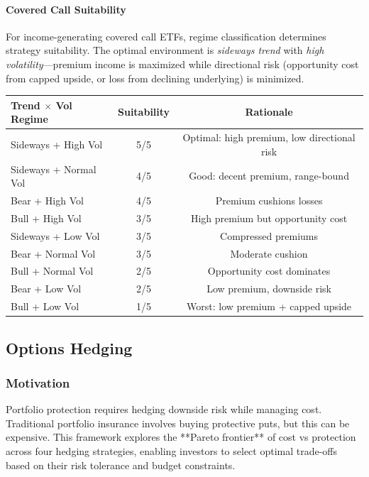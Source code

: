 \paragraph{Covered Call Suitability}

For income-generating covered call ETFs, regime classification determines strategy suitability. The optimal environment is \textit{sideways trend} with \textit{high volatility}---premium income is maximized while directional risk (opportunity cost from capped upside, or loss from declining underlying) is minimized.

\begin{center}
\begin{tabular}{lcc}
\hline
\textbf{Trend $\times$ Vol Regime} & \textbf{Suitability} & \textbf{Rationale} \\
\hline
Sideways + High Vol & 5/5 & Optimal: high premium, low directional risk \\
Sideways + Normal Vol & 4/5 & Good: decent premium, range-bound \\
Bear + High Vol & 4/5 & Premium cushions losses \\
Bull + High Vol & 3/5 & High premium but opportunity cost \\
Sideways + Low Vol & 3/5 & Compressed premiums \\
Bear + Normal Vol & 3/5 & Moderate cushion \\
Bull + Normal Vol & 2/5 & Opportunity cost dominates \\
Bear + Low Vol & 2/5 & Low premium, downside risk \\
Bull + Low Vol & 1/5 & Worst: low premium + capped upside \\
\hline
\end{tabular}
\end{center}

\subsection{Options Hedging}

\subsubsection{Motivation}

Portfolio protection requires hedging downside risk while managing cost. Traditional portfolio insurance involves buying protective puts, but this can be expensive. This framework explores the **Pareto frontier** of cost vs protection across four hedging strategies, enabling investors to select optimal trade-offs based on their risk tolerance and budget constraints.

